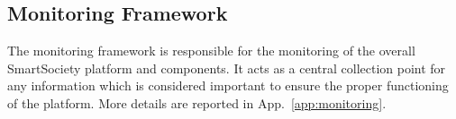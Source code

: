 \subsection{Monitoring Framework}
The monitoring framework is responsible for the monitoring of the overall SmartSociety platform and components. It acts as a central collection point for any information which is considered important to ensure the proper functioning of the platform. More details are reported in App.~\ref{app:monitoring}.





